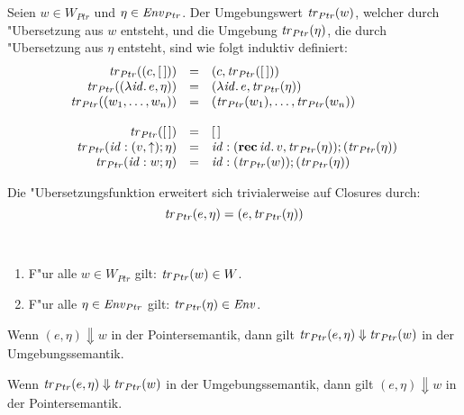 \documentclass[12pt,fleqn,a4paper]{article}
\begin{document}
\begin{definition}["Ubersetzungsfunktion]
  Seien $w \in W_{Ptr}$ und $\eta \in {\text{\it Env\/}}_{Ptr}$. Der Umgebungswert ${\text{\it tr\/}}_{Ptr}(w)$, welcher durch "Ubersetzung
  aus $w$ entsteht, und die Umgebung ${\text{\it tr\/}}_{Ptr}(\eta)$, die durch "Ubersetzung aus $\eta$ entsteht, sind wie folgt
  induktiv definiert:
  \[\begin{array}{rcl}
    {\text{\it tr\/}}_{Ptr}((c,[\,])) &=& (c,{\text{\it tr\/}}_{Ptr}([\,])) \\
    {\text{\it tr\/}}_{Ptr}((\lambda {\text{\it id\/}}.\,e,\eta)) &=& (\lambda {\text{\it id\/}}.\,e,{\text{\it tr\/}}_{Ptr}(\eta)) \\
    {\text{\it tr\/}}_{Ptr}((w_1,\ldots,w_n)) &=& ({\text{\it tr\/}}_{Ptr}(w_1),\ldots,{\text{\it tr\/}}_{Ptr}(w_n)) \\
    \\
    {\text{\it tr\/}}_{Ptr}([\,]) &=& [\,] \\
    {\text{\it tr\/}}_{Ptr}({\text{\it id\/}}:(v,\uparrow);\eta) &=& {\text{\it id\/}}:(\mathbf{rec}\,{\text{\it id\/}}.\,v,{\text{\it tr\/}}_{Ptr}(\eta));({\text{\it tr\/}}_{Ptr}(\eta)) \\
    {\text{\it tr\/}}_{Ptr}({\text{\it id\/}}:w;\eta) &=& {\text{\it id\/}}:({\text{\it tr\/}}_{Ptr}(w));({\text{\it tr\/}}_{Ptr}(\eta)) \\
  \end{array}\]
\end{definition}

\noindent
Die "Ubersetzungsfunktion erweitert sich trivialerweise auf Closures durch:
\[{\text{\it tr\/}}_{Ptr}(e,\eta) = (e,{\text{\it tr\/}}_{Ptr}(\eta))\]

\begin{corollary} \
  \begin{enumerate}
  \item F"ur alle $w \in W_{Ptr}$ gilt: ${\text{\it tr\/}}_{Ptr}(w)\in W$.
  \item F"ur alle $\eta \in {\text{\it Env\/}}_{Ptr}$ gilt: ${\text{\it tr\/}}_{Ptr}(\eta) \in {\text{\it Env\/}}$.
  \end{enumerate}
\end{corollary}

\begin{theorem}
  Wenn $(e,\eta) \Downarrow w$ in der Pointersemantik, dann gilt
  ${\text{\it tr\/}}_{Ptr}(e,\eta) \Downarrow {\text{\it tr\/}}_{Ptr}(w)$ in der Umgebungssemantik.
\end{theorem}

\begin{theorem}
  Wenn ${\text{\it tr\/}}_{Ptr}(e,\eta) \Downarrow {\text{\it tr\/}}_{Ptr}(w)$ in der Umgebungssemantik,
  dann gilt $(e,\eta) \Downarrow w$ in der Pointersemantik.
\end{theorem}
\end{document}
